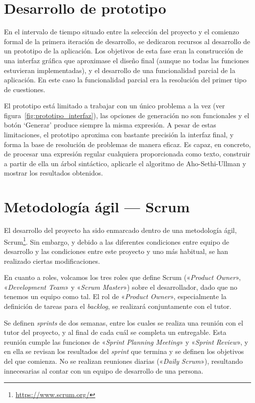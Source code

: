 
\section{Desarrollo de prototipo}
En el intervalo de tiempo situado entre la selección del proyecto y el comienzo formal de la primera iteración de desarrollo, se dedicaron recursos al desarrollo de un prototipo de la aplicación.
Los objetivos de esta fase eran la construcción de una interfaz gráfica que aproximase el diseño final (aunque no todas las funciones estuvieran implementadas), y el desarrollo de una funcionalidad parcial de la aplicación.
En este caso la funcionalidad parcial era la resolución del primer tipo de cuestiones.


El prototipo está limitado a trabajar con un único problema a la vez (ver figura~\ref{fig:prototipo_interfaz}), las opciones de generación no son funcionales y el botón `Generar' produce siempre la misma expresión.
A pesar de estas limitaciones, el prototipo aproxima con bastante precisión la interfaz final, y forma la base de resolución de problemas de manera eficaz.
Es capaz, en concreto, de procesar una expresión regular cualquiera proporcionada como texto, construir a partir de ella un árbol sintáctico, aplicarle el algoritmo de Aho-Sethi-Ullman y mostrar los resultados obtenidos.

\section{Metodología ágil --- Scrum}
El desarrollo del proyecto ha sido enmarcado dentro de una metodología ágil, Scrum\footnote{\url{https://www.scrum.org/}}.
Sin embargo, y debido a las diferentes condiciones entre equipo de desarrollo y las condiciones entre este proyecto y uno más habitual, se han realizado ciertas modificaciones.

En cuanto a roles, volcamos los tres roles que define Scrum («\emph{Product Owner}», «\emph{Development Team}» y «\emph{Scrum Master}») sobre el desarrollador, dado que no tenemos un equipo como tal.
El rol de «\emph{Product Owner}», especialmente la definición de tareas para el \emph{backlog}, se realizará conjuntamente con el tutor.

Se definen \emph{sprints} de dos semanas, entre los cuales se realiza una reunión con el tutor del proyecto, y al final de cada cuál se completa un entregable.
Esta reunión cumple las funciones de «\emph{Sprint Planning Meeting}» y «\emph{Sprint Review}», y en ella se revisan los resultados del \emph{sprint} que termina y se definen los objetivos del que comienza.
No se realizan reuniones diarias («\emph{Daily Scrum}»), resultando innecesarias al contar con un equipo de desarrollo de una persona.

